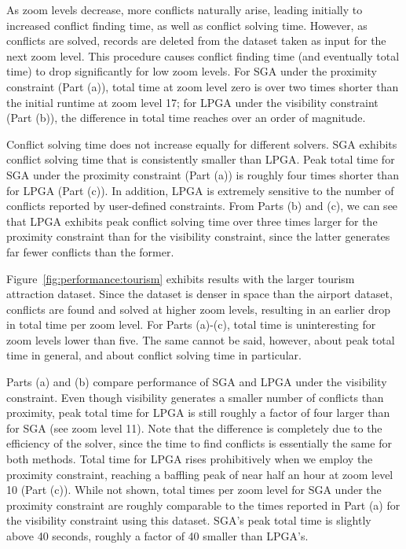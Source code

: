 \documentclass[11pt, oneside]{report}
\begin{document}
{As zoom levels decrease, more conflicts naturally arise, leading initially to increased conflict finding time, as well as conflict solving time. However, as conflicts are solved, records are deleted from the dataset taken as input for the next zoom level. This procedure causes conflict finding time (and eventually total time) to drop significantly for low zoom levels. For SGA under the proximity constraint (Part (a)), total time at zoom level zero is over two times shorter than the initial runtime at zoom level 17; for LPGA under the visibility constraint (Part (b)), the difference in total time reaches over an order of magnitude.  

Conflict solving time does not increase equally for different solvers. SGA exhibits conflict solving time that is consistently smaller than LPGA. Peak total time for SGA under the proximity constraint (Part (a)) is roughly four times shorter than for LPGA (Part (c)). In addition, LPGA is extremely sensitive to the number of conflicts reported by user-defined constraints. From Parts (b) and (c), we can see that LPGA exhibits peak conflict solving time over three times larger for the proximity constraint than for the visibility constraint, since the latter generates far fewer conflicts than the former.

Figure~\ref{fig:performance:tourism} exhibits results with the larger tourism attraction dataset. Since the dataset is denser in space than the airport dataset, conflicts are found and solved at higher zoom levels, resulting in an earlier drop in total time per zoom level. For Parts (a)-(c), total time is uninteresting for zoom levels lower than five. The same cannot be said, however, about peak total time in general, and about conflict solving time in particular.

Parts (a) and (b) compare performance of SGA and LPGA under the visibility constraint. Even though visibility generates a smaller number of conflicts than proximity, peak total time for LPGA is still roughly a factor of four larger than for SGA (see zoom level 11). Note that the difference is completely due to the efficiency of the solver, since the time to find conflicts is essentially the same for both methods. Total time for LPGA rises prohibitively when we employ the proximity constraint, reaching a baffling peak of near half an hour at zoom level 10 (Part (c)). While not shown, total times per zoom level for SGA under the proximity constraint are roughly comparable to the times reported in Part (a) for the visibility constraint using this dataset. SGA's peak total time is slightly above 40 seconds, roughly a factor of 40 smaller than LPGA's.         

}
\end{document}
